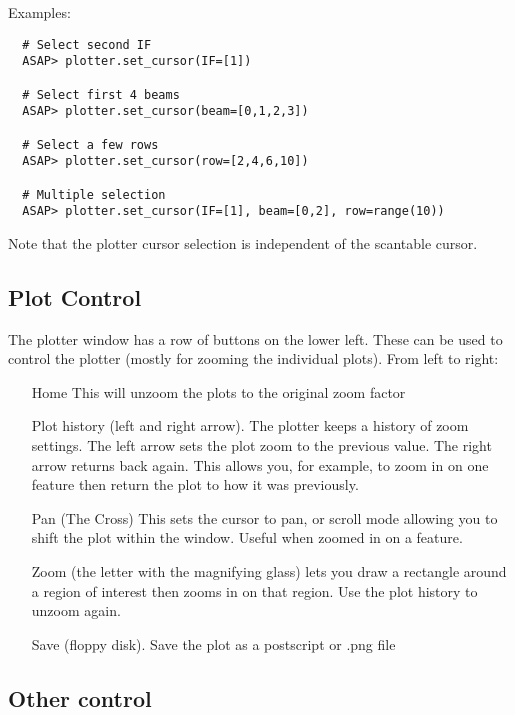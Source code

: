 \documentclass[11pt]{article}
\begin{document}
Examples:

\begin{verbatim}
  # Select second IF
  ASAP> plotter.set_cursor(IF=[1])

  # Select first 4 beams
  ASAP> plotter.set_cursor(beam=[0,1,2,3])

  # Select a few rows
  ASAP> plotter.set_cursor(row=[2,4,6,10])

  # Multiple selection
  ASAP> plotter.set_cursor(IF=[1], beam=[0,2], row=range(10))
\end{verbatim}

Note that the plotter cursor selection is independent of the scantable
cursor.

\subsection{Plot Control}

The plotter window has a row of buttons on the lower left. These can
be used to control the plotter (mostly for zooming the individual
plots). From left to right:

\begin{itemize}

\item[Home] This will unzoom the plots to the original zoom factor

\item[Plot history] (left and right arrow). The plotter keeps a
history of zoom settings. The left arrow sets the plot zoom to the
previous value. The right arrow returns back again. This allows you,
for example, to zoom in on one feature then return the plot to how it
was previously.

\item[Pan] (The Cross) This sets the cursor to pan, or scroll mode
       allowing you to shift the plot within the window. Useful when
       zoomed in on a feature.

\item[Zoom] (the letter with the magnifying glass) lets you draw a
       rectangle around a region of interest then zooms in on that
       region. Use the plot history to unzoom again.  

\item[Save] (floppy disk). Save the plot as a postscript or .png file

\end{itemize}

\subsection{Other control}
\end{document}
